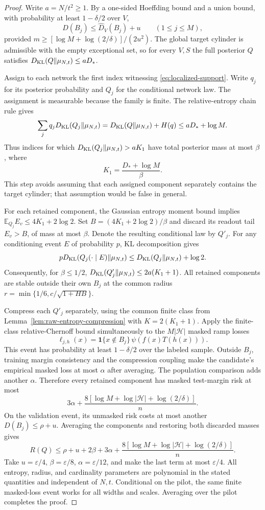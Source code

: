 \begin{proof}
Write $a=N/t^2\ge1$. By a one-sided Hoeffding bound and a union bound,
with probability at least $1-\delta/2$ over $V$,
\[
 D(B_j)\le\widehat D_V(B_j)+u\qquad(1\le j\le M),
\]
provided $m\ge[\log M+\log(2/\delta)]/(2u^2)$.
The global target cylinder is admissible with the empty exceptional set,
so for every $V,S$ the full posterior $Q$ satisfies
$D_{\rm KL}(Q\Vert\mu_{N,t})\le aD_*$.

Assign to each network the first index witnessing
\eqref{eq:localized-support}. Write $q_j$ for its posterior probability
and $Q_j$ for the conditional network law. The assignment is measurable
because the family is finite. The relative-entropy chain rule gives
\begin{equation}\label{eq:localized-component-entropy}
 \sum_jq_jD_{\rm KL}(Q_j\Vert\mu_{N,t})
 =D_{\rm KL}(Q\Vert\mu_{N,t})+H(q)
 \le aD_*+\log M.
\end{equation}
Thus indices for which $D_{\rm KL}(Q_j\Vert\mu_{N,t})>aK_1$ have total
posterior mass at most $\beta$, where
\[
 K_1=\frac{D_*+\log M}{\beta}.
\]
This step avoids assuming that each assigned component separately contains
the target cylinder; that assumption would be false in general.

For each retained component, the Gaussian entropy moment bound implies
$\mathbb E_{Q_j}E_v\le4K_1+2\log2$. Set
$B=(4K_1+2\log2)/\beta$ and discard its readout tail $E_v>B$, of mass at
most $\beta$. Denote the resulting conditional law by $Q'_j$.
For any conditioning event $E$ of probability $p$, KL decomposition gives
\[
 pD_{\rm KL}(Q_j(\cdot\mid E)\Vert\mu_{N,t})
 \le D_{\rm KL}(Q_j\Vert\mu_{N,t})+\log2.
\]
Consequently, for $\beta\le1/2$,
$D_{\rm KL}(Q'_j\Vert\mu_{N,t})\le2a(K_1+1)$.
All retained components are stable outside their own $B_j$ at the common
radius $r=\min\{1/6,c/\sqrt{1+HB}\}$.

Compress each $Q'_j$ separately, using the common finite class from
Lemma~\ref{lem:raw-entropy-compression} with $K=2(K_1+1)$.
Apply the finite-class relative-Chernoff bound simultaneously to the
$M|\mathcal H|$ masked ramp losses
\[
 \ell_{j,h}(x)=\mathbf1\{x\notin B_j\}\,
                      \psi(f(x)T(h(x))).
\]
This event has probability at least $1-\delta/2$ over the labeled sample.
Outside $B_j$, training margin consistency and the compression coupling
make the candidate's empirical masked loss at most $\alpha$ after
averaging. The population comparison adds another $\alpha$.
Therefore every retained component has masked test-margin risk at most
\[
 3\alpha+\frac{8[\log M+\log|\mathcal H|+\log(2/\delta)]}{n}.
\]
On the validation event, its unmasked risk costs at most another
$D(B_j)\le\rho+u$. Averaging the components and restoring both discarded
masses gives
\[
 R(Q)\le\rho+u+2\beta+3\alpha+
       \frac{8[\log M+\log|\mathcal H|+\log(2/\delta)]}{n}.
\]
Take $u=\varepsilon/4$, $\beta=\varepsilon/8$,
$\alpha=\varepsilon/12$, and make the last term at most
$\varepsilon/4$. All entropy, radius, and cardinality parameters are
polynomial in the stated quantities and independent of $N,t$.
Conditional on the pilot, the same finite masked-loss event works for
all widths and scales. Averaging over the pilot completes the proof.
\end{proof}
